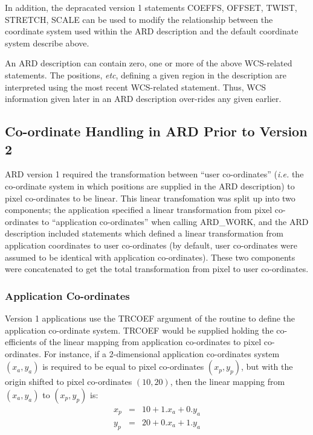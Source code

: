 \begin{enumerate}
In addition, the depracated version 1 statements COEFFS, OFFSET, TWIST,
STRETCH, SCALE can be used to modify the relationship between the
coordinate system used within the ARD description and the default
coordinate system describe above.

\end{enumerate}

An ARD description can contain zero, one or more of the above WCS-related 
statements. The positions, {\em etc}, defining a given region in the
description are interpreted using the most recent WCS-related statement.
Thus, WCS information given later in an ARD description over-rides any
given earlier.

\subsection{Co-ordinate Handling in ARD Prior to Version 2}

ARD version 1 required the transformation between ``user co-ordinates''
({\em i.e.} the co-ordinate system in which positions are supplied in the
ARD description) to pixel co-ordinates to be linear. This linear
transfomation was split up into two components; the application specified
a linear transformation from pixel co-ordinates to ``application
co-ordinates'' when calling ARD\_WORK, and the ARD description included
statements which defined a linear transformation from application
coordinates to user co-ordinates (by default, user co-ordinates were
assumed to be identical with application co-ordinates). These two
components were concatenated to get the total transformation from pixel
to user co-ordinates.

\subsubsection{Application Co-ordinates}
Version 1 applications use the TRCOEF argument of the  
routine to define the application co-ordinate system. TRCOEF would be supplied 
holding the
co-efficients of the linear mapping from application co-ordinates to pixel
co-ordinates. For instance, if a 2-dimensional application co-ordinates system
$(x_{a},y_{a})$ is required to be equal to pixel co-ordinates $(x_{p},y_{p})$,
but with the origin shifted to pixel co-ordinates $(10,20)$, then the linear
mapping from $(x_{a},y_{a})$ to $(x_{p},y_{p})$ is:
\small
\begin{eqnarray*}
x_{p} & = & 10 + 1.x_{a} + 0.y_{a} \\
y_{p} & = & 20 + 0.x_{a} + 1.y_{a} 
\end{eqnarray*}
\normalsize

